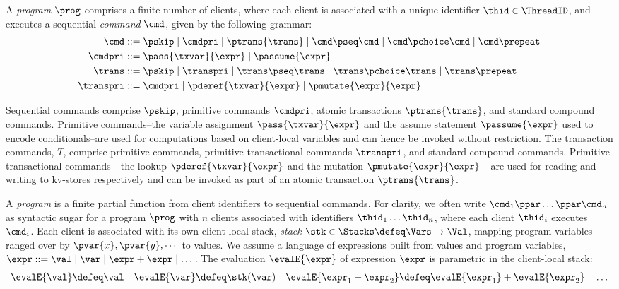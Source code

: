  A 
\emph{program} \( \prog \) comprises a finite number of clients,
where each client is associated with a unique identifier \( \thid \in \ThreadID \), 
and executes a sequential \emph{command} $\cmd$, given by the following grammar:
\begin{align*}
\cmd & ::=  
\pskip \mid 
\cmdpri \mid  
\ptrans{\trans} \mid 
\cmd \pseq \cmd \mid 
\cmd \pchoice \cmd \mid 
\cmd \prepeat  
\\
\cmdpri & ::=  
\pass{\txvar}{\expr} \mid 
\passume{\expr} 
\\
\trans & ::=
\pskip \mid
\transpri \mid 
\trans \pseq \trans \mid
\trans \pchoice \trans \mid
\trans\prepeat    
\\
\transpri & ::= 
\cmdpri \mid
\pderef{\txvar}{\expr} \mid
\pmutate{\expr}{\expr} 
\end{align*} 
%

Sequential commands  comprise $\pskip$,  primitive commands $\cmdpri
$, atomic transactions
$\ptrans{\trans}$,  and standard
compound commands. 
Primitive commands--the variable assignment
$\pass{\txvar}{\expr}$ and the assume statement $\passume{\expr}$
used to encode conditionals--are used for computations based on 
client-local variables 
and can hence be invoked without restriction. The 
transaction commands, $T$, 
comprise primitive commands, 
primitive transactional commands $\transpri$,  and standard compound commands. 
Primitive transactional commands---the lookup $\pderef{\txvar}{\expr}$ and the mutation 
$\pmutate{\expr}{\expr}$---are used for reading and writing to kv-stores respectively and 
can be invoked  as part of an atomic transaction $\ptrans{\trans}$.

A {\em program} is a finite partial function from client identifiers to sequential
commands.
For clarity, we often write \( \cmd_{1}\ppar \dots \ppar \cmd_{n}\) as syntactic sugar 
for a program \( \prog \) with $n$ clients associated with identifiers
$\thid_1 \dots \thid_n$, where each client $\thid_i$ executes
$\cmd_i$. Each client is associated with its own client-local stack,  \emph{stack} 
$\stk \in \Stacks \defeq \Vars \to \Val$,  mapping program variables
ranged over by $\pvar{x}, \pvar{y}, \cdots$
to values. 
We assume a language of expressions built from values
and program variables, 
\( \expr ::= \val \mid \var \mid \expr + \expr \mid \dots  \).
The evaluation $\evalE{\expr}$ of  expression $\expr$ is parametric in
the client-local stack:
\begin{gather*}
\evalE{\val} \defeq
\val
\quad
\evalE{\var} \defeq
\stk(\var)
\quad
\evalE{\expr_{1} + \expr_{2}} \defeq
\evalE{\expr_{1}} + \evalE{\expr_{2}}
\quad
\dots
\end{gather*}

